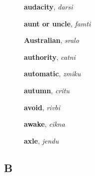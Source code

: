 \documentclass[12pt]{book}
\begin{document}
\begin{description}
\item[ ] \textbf{audacity}, \textit{darsi}

\item[ ] \textbf{aunt or uncle}, \textit{famti}

\item[ ] \textbf{Australian}, \textit{sralo}

\item[ ] \textbf{authority}, \textit{catni}

\item[ ] \textbf{automatic}, \textit{zmiku}

\item[ ] \textbf{autumn}, \textit{critu}

\item[ ] \textbf{avoid}, \textit{rivbi}

\item[ ] \textbf{awake}, \textit{cikna}

\item[ ] \textbf{axle}, \textit{jendu}



\end{description}



\subsection{B} %
\end{document}
